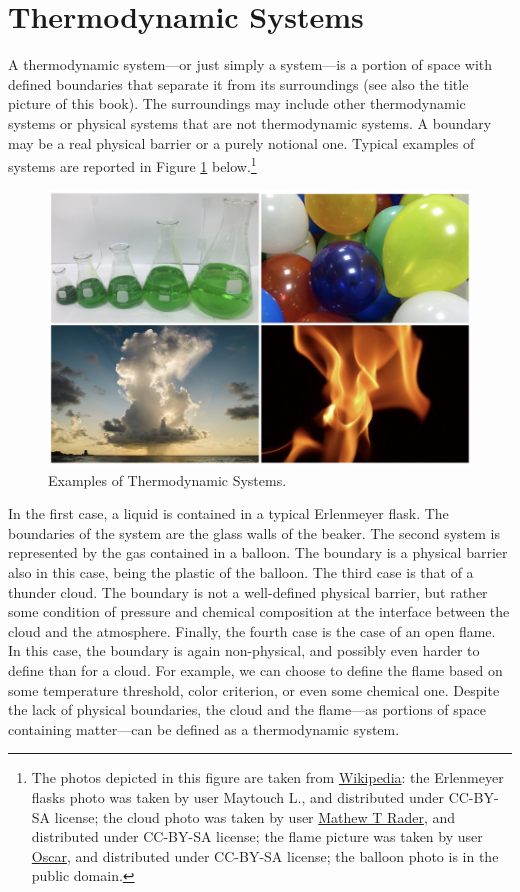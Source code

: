 \documentclass[
  9pt,
]{extbook}
\theoremstyle{definition}
\theoremstyle{definition}
\theoremstyle{definition}
\theoremstyle{definition}
\theoremstyle{remark}
\begin{document}
\section{Thermodynamic Systems}\label{thermodynamic-systems}

A thermodynamic system---or just simply a system---is a portion of space with defined boundaries that separate it from its surroundings (see also the title picture of this book). The surroundings may include other thermodynamic systems or physical systems that are not thermodynamic systems. A boundary may be a real physical barrier or a purely notional one. Typical examples of systems are reported in Figure \ref{fig:Fig1c1} below.\footnote{The photos depicted in this figure are taken from \href{https://en.wikipedia.org}{Wikipedia}: the Erlenmeyer flasks photo was taken by user Maytouch L., and distributed under CC-BY-SA license; the cloud photo was taken by user \href{https://commons.wikimedia.org/wiki/User:Matthew_T_Rader}{Mathew T Rader}, and distributed under CC-BY-SA license; the flame picture was taken by user \href{https://commons.wikimedia.org/wiki/User:Oscar}{Oscar}, and distributed under CC-BY-SA license; the balloon photo is in the public domain.}

\begin{figure}

{\centering \includegraphics[width=0.7\linewidth]{./img/OEP_Figures.001} 

}

\caption{Examples of Thermodynamic Systems.}\label{fig:Fig1c1}
\end{figure}

In the first case, a liquid is contained in a typical Erlenmeyer flask. The boundaries of the system are the glass walls of the beaker. The second system is represented by the gas contained in a balloon. The boundary is a physical barrier also in this case, being the plastic of the balloon. The third case is that of a thunder cloud. The boundary is not a well-defined physical barrier, but rather some condition of pressure and chemical composition at the interface between the cloud and the atmosphere. Finally, the fourth case is the case of an open flame. In this case, the boundary is again non-physical, and possibly even harder to define than for a cloud. For example, we can choose to define the flame based on some temperature threshold, color criterion, or even some chemical one. Despite the lack of physical boundaries, the cloud and the flame---as portions of space containing matter---can be defined as a thermodynamic system.
\end{document}
